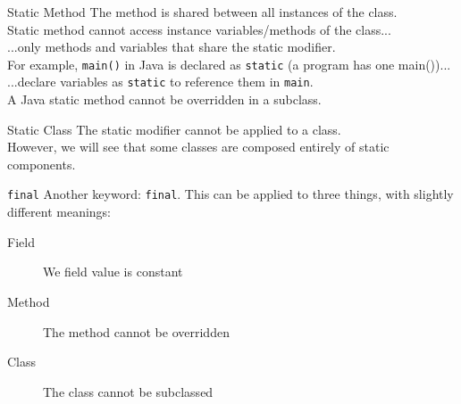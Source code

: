 \documentclass[aspectratio=169]{beamer}
\begin{document}
\begin{frame}{Static Method}
The method is shared between all instances of the class. 	\\
\vspace{1em}
Static method cannot access instance variables/methods of the class...		\\
\quad\quad ...only methods and variables that share the static modifier. \\
\vspace{1em}
For example, \texttt{main()} in Java is declared as \texttt{static} (a program has one main())... \\
\quad ...declare variables as \texttt{static} to reference them in \texttt{main}. \\
\vspace{1em}
A Java static method cannot be overridden in a subclass.
\end{frame}



\begin{frame}{Static Class}
The static modifier cannot be applied to a class. \\
\vspace{2em}
However, we will see that some classes are composed entirely of static components. \\
\end{frame}



\begin{frame}{\texttt{final}}
Another keyword: \texttt{final}. This can be applied to three things, with slightly different meanings:
\begin{description}
	\item[Field] We field value is constant
	\item[Method] The method cannot be overridden
	\item[Class] The class cannot be subclassed
\end{description}
\end{frame}
\end{document}
